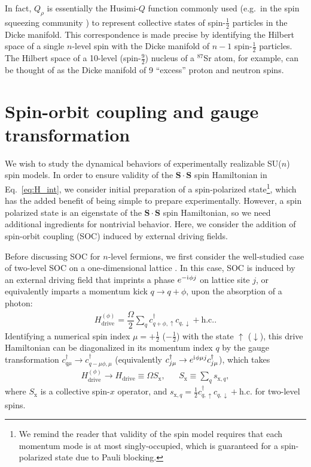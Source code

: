 \documentclass[nofootinbib,twocolumn]{revtex4-2}
\renewcommand{\t}{\text} %
\newcommand{\f}[2]{\dfrac{#1}{#2}} %
\renewcommand{\v}{\bm} %
\renewcommand{\c}{\cdot} %
\renewcommand{\i}{\mathrm{i}\mkern1mu} %
\newcommand{\1}{\mathds{1}}
\newcommand{\up}{\uparrow}
\newcommand{\dn}{\downarrow}
\newcommand{\x}{\text{x}}
\begin{document}
In fact, $Q_\rho$ is essentially the Husimi-$Q$ function commonly used (e.g.~in the spin squeezing community \cite{ma2011quantum}) to represent collective states of spin-$\frac{1}{2}$ particles in the Dicke manifold.
This correspondence is made precise by identifying the Hilbert space of a single $n$-level spin with the Dicke manifold of $n-1$ spin-$\frac{1}{2}$ particles.
The Hilbert space of a 10-level (spin-$\frac92$) nucleus of a ${}^{87}$Sr atom, for example, can be thought of as the Dicke manifold of 9 ``excess'' proton and neutron spins.

\section{Spin-orbit coupling and gauge transformation}
\label{sec:SOC}

We wish to study the dynamical behaviors of experimentally realizable SU($n$) spin models.
In order to ensure validity of the $\v S\c\v S$ spin Hamiltonian in Eq.~\eqref{eq:H_int}, we consider initial preparation of a spin-polarized state\footnote{We remind the reader that validity of the spin model requires that each momentum mode is at most singly-occupied, which is guaranteed for a spin-polarized state due to Pauli blocking.}, which has the added benefit of being simple to prepare experimentally.
However, a spin polarized state is an eigenstate of the $\v S\c\v S$ spin Hamiltonian, so we need additional ingredients for nontrivial behavior.
Here, we consider the addition of spin-orbit coupling (SOC) induced by external driving fields.

Before discussing SOC for $n$-level fermions, we first consider the well-studied case of two-level SOC on a one-dimensional lattice \cite{wall2016synthetic, bromley2018dynamics}.
In this case, SOC is induced by an external driving field that imprints a phase $e^{-\i\phi j}$ on lattice site $j$, or equivalently imparts a momentum kick $q\to q+\phi$, upon the absorption of a photon:
\begin{align}
  H_{\t{drive}}^{(\phi)}
  = \f{\Omega}{2} \sum_q c_{q+\phi,\up}^\dag c_{q,\dn} + \t{h.c.}.
  \label{eq:drive_2}
\end{align}
Identifying a numerical spin index $\mu=+\frac12$ ($-\frac12$) with the state $\up$ ($\dn$), this drive Hamiltonian can be diagonalized in its momentum index $q$ by the gauge transformation $c_{q\mu}^\dag\to c_{q-\mu\phi,\mu}^\dag$ (equivalently $c_{j\mu}^\dag\to e^{\i\phi\mu j} c_{j\mu}^\dag$), which takes
\begin{align}
  H_{\t{drive}}^{(\phi)} \to H_{\t{drive}} \equiv \Omega S_\x,
  &&
  S_\x \equiv \sum_q s_{\x,q},
  \label{eq:drive_trans}
\end{align}
where $S_\x$ is a collective spin-$x$ operator, and $s_{\x,q}=\frac12 c_{q,\up}^\dag c_{q,\dn} + \t{h.c.}$ for two-level spins.
\end{document}
